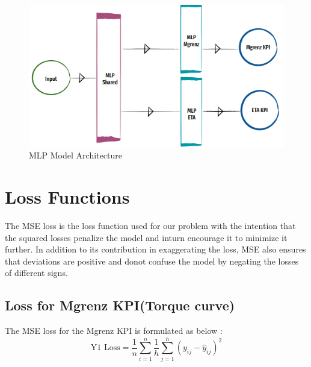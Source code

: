 \documentclass{report} %
\begin{document}
\begin{figure}[H]
    \centering
    \includegraphics[width=1\textwidth]{./ReportImages/mlp_architecture.png} 
    \caption{MLP Model Architecture}
    \label{fig:MLP Model Architecture}
\end{figure}

\section{Loss Functions}\label{sec:Loss Functions}
The \ac{MSE} loss is the loss function used for our problem with the intention that the squared losses penalize the model and inturn encourage it to minimize it further.
In addition to its contribution in exaggerating the loss, \ac{MSE} also ensures that deviations are positive and donot confuse the model by negating the losses of different signs. \\

\subsection{Loss for Mgrenz \ac{KPI}(Torque curve)}\label{sec:Loss for 2D KPI}

The \ac{MSE} loss for the Mgrenz \ac{KPI} is formulated as below :
\begin{equation}
    \text{Y1 Loss} = \frac{1}{n} \sum_{i=1}^{n} \frac{1}{h} \sum_{j=1}^{h} (y_{ij} - \hat{y}_{ij})^2
    \label{eq:Y1 Loss}
\end{equation} 



\end{document}
